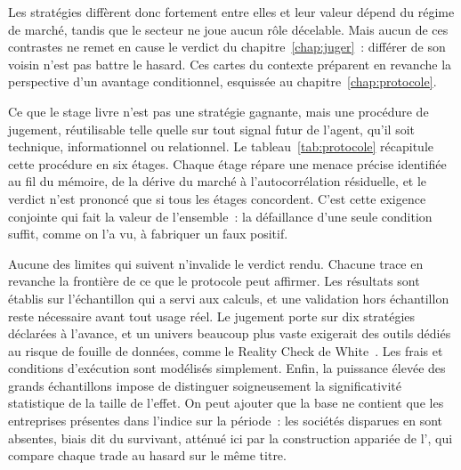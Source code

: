 
Les stratégies diffèrent donc fortement entre elles et leur valeur
dépend du régime de marché, tandis que le secteur ne joue aucun rôle
décelable. Mais aucun de ces contrastes ne remet en cause le verdict du
chapitre~\ref{chap:juger}~: différer de son voisin n'est pas battre le
hasard. Ces cartes du contexte préparent en revanche la perspective d'un
avantage conditionnel, esquissée au chapitre~\ref{chap:protocole}.




Ce que le stage livre n'est pas une stratégie gagnante, mais une
procédure de jugement, réutilisable telle quelle sur tout signal futur
de l'agent, qu'il soit technique, informationnel ou relationnel. Le
tableau~\ref{tab:protocole} récapitule cette procédure en six étages.
Chaque étage répare une menace précise identifiée au fil du mémoire, de
la dérive du marché à l'autocorrélation résiduelle, et le verdict n'est
prononcé que si tous les étages concordent. C'est cette exigence
conjointe qui fait la valeur de l'ensemble~: la défaillance d'une seule
condition suffit, comme on l'a vu, à fabriquer un faux positif.



Aucune des limites qui suivent n'invalide le verdict rendu. Chacune
trace en revanche la frontière de ce que le protocole peut affirmer.
Les résultats sont établis sur l'échantillon qui a servi aux calculs, et
une validation hors échantillon reste nécessaire avant tout usage réel.
Le jugement porte sur dix stratégies déclarées à l'avance, et un univers
beaucoup plus vaste exigerait des outils dédiés au risque de fouille de
données, comme le Reality Check de White~\cite{white2000}. Les frais et
conditions d'exécution sont modélisés simplement. Enfin, la puissance
élevée des grands échantillons impose de distinguer soigneusement la
significativité statistique de la taille de l'effet. On peut ajouter que
la base ne contient que les entreprises présentes dans l'indice sur la
période~: les sociétés disparues en sont absentes, biais dit du
survivant, atténué ici par la construction appariée de l'\edgevar{}, qui
compare chaque trade au hasard sur le même titre.

